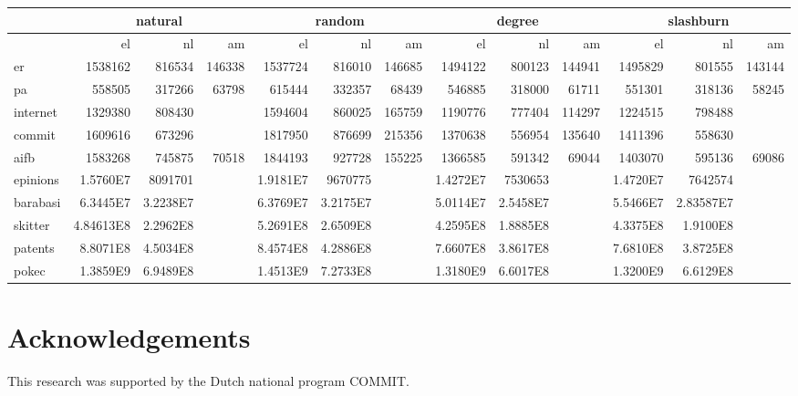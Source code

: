 \documentclass{article}
\begin{document}
\begin{landscape}
\hspace{-1cm}
\begin{tabular}{|l | r r r | r r r | r r r | r r r |}
\hline
\multicolumn{1}{|c}{} & \multicolumn{3}{c}{natural} & \multicolumn{3}{c}{random} & \multicolumn{3}{c}{degree} & \multicolumn{3}{c|}{slashburn} \\
  \hline                       
  & el & nl & am & el & nl & am & el & nl & am & el & nl & am \\ 
  \hline
 er & 1538162 & 816534 & 146338 & 1537724 & 816010 & 146685 & 1494122 & 800123 & 144941 & 1495829 & 801555 & 143144 \\ 
 pa & 558505 & 317266 & 63798 & 615444 & 332357 & 68439 & 546885 & 318000 & 61711 & 551301 & 318136 & 58245 \\
 internet & 1329380 & 808430 & & 1594604 & 860025 & 165759 & 1190776 & 777404 & 114297 & 1224515 & 798488 &  \\
 commit & 1609616 & 673296 &  & 1817950 & 876699 & 215356 & 1370638 & 556954 & 135640 & 1411396 & 558630 &  \\
 aifb & 1583268 & 745875 & 70518 & 1844193 & 927728 & 155225 & 1366585 & 591342 & 69044 & 1403070 & 595136 & 69086 \\
 epinions & 1.5760E7 & 8091701 &  & 1.9181E7 & 9670775 &  & 1.4272E7 & 7530653 &  & 1.4720E7 & 7642574 &  \\
 barabasi & 6.3445E7 & 3.2238E7 & & 6.3769E7 & 3.2175E7 & & 5.0114E7 & 2.5458E7 & & 5.5466E7 & 2.83587E7 & \\
 skitter & 4.84613E8 & 2.2962E8 & & 5.2691E8 & 2.6509E8 &  & 4.2595E8 & 1.8885E8 & & 4.3375E8 & 1.9100E8 &  \\
 patents &  8.8071E8 &  4.5034E8  & & 8.4574E8 & 4.2886E8 &  & 7.6607E8 & 3.8617E8 &  & 7.6810E8 & 3.8725E8 &  \\
 pokec &  1.3859E9 &  6.9489E8  &  & 1.4513E9 & 7.2733E8 & & 1.3180E9 & 6.6017E8 &  & 1.3200E9 & 6.6129E8 &  \\
  \hline  
\end{tabular}
\end{landscape}
\section{Acknowledgements}
This research was supported by the Dutch national program COMMIT.



\end{document}
